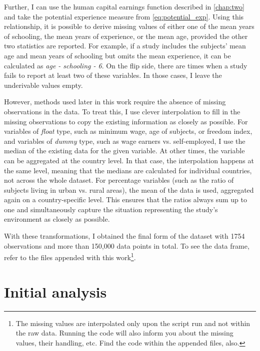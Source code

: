 Further, I can use the human capital earnings function described in \autoref{chap:two} and take the potential experience measure from \autoref{eq:potential_exp}. Using this relationship, it is possible to derive missing values of either one of the mean years of schooling, the mean years of experience, or the mean age, provided the other two statistics are reported. For example, if a study includes the subjects' mean age and mean years of schooling but omits the mean experience, it can be calculated as \textit{age - schooling - 6}. On the flip side, there are times when a study fails to report at least two of these variables. In those cases, I leave the underivable values empty.

However, methods used later in this work require the absence of missing observations in the data. To treat this, I use clever interpolation to fill in the missing observations to copy the existing information as closely as possible. For variables of \textit{float} type, such as minimum wage, age of subjects, or freedom index, and variables of \textit{dummy} type, such as wage earners vs. self-employed, I use the median of the existing data for the given variable. At other times, the variable can be aggregated at the country level. In that case, the interpolation happens at the same level, meaning that the medians are calculated for individual countries, not across the whole dataset. For percentage variables (such as the ratio of subjects living in urban vs. rural areas), the mean of the data is used, aggregated again on a country-specific level. This ensures that the ratios always sum up to one and simultaneously capture the situation representing the study's environment as closely as possible.

With these transformations, I obtained the final form of the dataset with 1754 observations and more than 150,000 data points in total. To see the data frame, refer to the files appended with this work\footnote{The missing values are interpolated only upon the script run and not within the raw data. Running the code will also inform you about the missing values, their handling, etc. Find the code within the appended files, also.}.

\section{Initial analysis}
\label{sec:initial_analysis}


